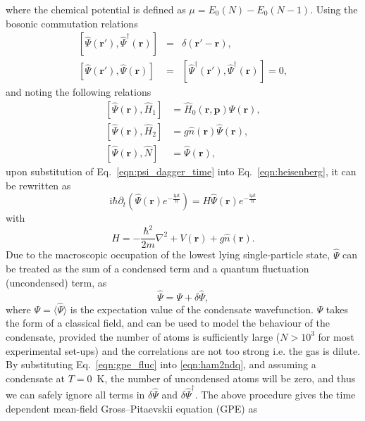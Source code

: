 where the chemical potential is defined as $\mu=E_0(N) - E_0(N-1)$. Using the bosonic commutation relations
\begin{eqnarray}
\left[\hat{\Psi}(\mathbf{r}'), \hat{\Psi}^{\dagger}(\mathbf{r})\right] &=& \delta(\mathbf{r}' - \mathbf{r}), \\
\left[\hat{\Psi}(\mathbf{r}'), \hat{\Psi}(\mathbf{r})\right] &=& \left[\hat{\Psi}^{\dagger}(\mathbf{r}'), \hat{\Psi}^{\dagger}(\mathbf{r})\right] = 0,
\end{eqnarray}
and noting the following relations
\begin{align}
\left[\hat{\Psi}(\mathbf{r}),\hat{H}_1 \right] & = \hat{H}_0(\mathbf{r},\mathbf{p})\hat{\Psi}(\mathbf{r}), \\
\left[\hat{\Psi}(\mathbf{r}),\hat{H}_2 \right] & = g\hat{n}(\textbf{r})\hat{\Psi}(\mathbf{r}), \\
\left[\hat{\Psi}(\mathbf{r}),\hat{N} \right] & = \hat{\Psi}(\textbf{r}) ,
\end{align}
upon substitution of Eq.~\eqref{eqn:psi_dagger_time} into Eq.~\eqref{eqn:heisenberg}, it can be rewritten as
\begin{equation}\label{eqn:almost_gpe}
    \textrm{i} \hbar \partial_t \left( \hat{\Psi}(\mathbf{r}) e^{-\frac{\textrm{i}\mu t}{\hbar}} \right) = H \hat{\Psi}(\mathbf{r}) e^{-\frac{\textrm{i}\mu t}{\hbar}}
\end{equation}
with
\begin{equation}\label{eqn:h_many}
H =  -\frac{\hbar^2}{2m}\nabla^2  + V(\mathbf{r}) + g\hat{n}(\mathbf{r}).
\end{equation}
Due to the macroscopic occupation of the lowest lying single-particle state, $\hat{\Psi}$ can be treated as the sum of a condensed term and a quantum fluctuation (uncondensed) term, as
\begin{equation}\label{eqn:gpe_fluc}
    \hat{\Psi} = \Psi + \delta\hat{\Psi},
\end{equation}
where $\Psi = \langle \hat{\Psi} \rangle$ is the expectation value of the condensate wavefunction. $\Psi$ takes the form of a classical field, and can be used to model the behaviour of the condensate, provided the number of atoms is sufficiently large ($N>10^3$ for most experimental set-ups) and the correlations are not too strong i.e. the gas is dilute. By substituting Eq.~\eqref{eqn:gpe_fluc} into \eqref{eqn:ham2ndq}, and assuming a condensate at $T=0$~K, the number of uncondensed atoms will be zero, and thus we can safely ignore all terms in $\delta\hat{\Psi}$ and $\delta\hat{\Psi}^{\dagger}$. The above procedure gives the time dependent mean-field Gross--Pitaevskii equation (GPE) as
